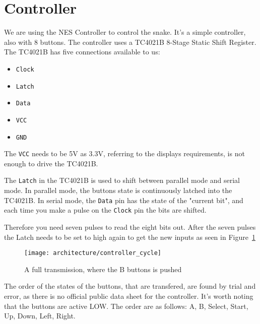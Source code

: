 \section{Controller}


We are using the NES Controller to control the snake. It's a simple controller, also with 8 buttons. The controller uses a TC4021B 8-Stage Static Shift Register. The TC4021B has five connections available to us\cite{toshiba:tc4021b}:
\begin{itemize}
\item \texttt{Clock}
\item \texttt{Latch}
\item \texttt{Data}
\item \texttt{VCC}
\item \texttt{GND}
\end{itemize}

The \texttt{VCC} needs to be 5V as 3.3V, referring to the displays requirements, is not enough to drive the TC4021B.

The \texttt{Latch} in the TC4021B is used to shift between parallel mode and serial mode. In parallel mode, the buttons state is continuously latched into the TC4021B. In serial mode, the \texttt{Data} pin has the state of the "current bit", and each time you make a pulse on the \texttt{Clock} pin the bits are shifted.

Therefore you need seven pulses to read the eight bits out. After the seven pulses the Latch needs to be set to high again to get the new inputs as seen in Figure~\ref{fig:controller_cycle}

\begin{figure}
\centering
\texttt{[image: architecture/controller\_cycle]}
\caption{A full transmission, where the B buttons is pushed}
\label{fig:controller_cycle}
\end{figure}

The order of the states of the buttons, that are transfered, are found by  trial and error, as there is no official public data sheet for the controller. It's worth noting that the buttons are active LOW. The order are as follows: A, B, Select, Start, Up, Down, Left, Right.

